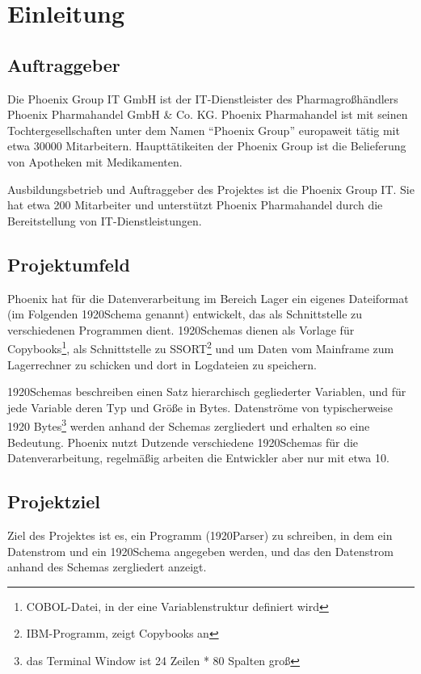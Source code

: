 \section{Einleitung}
\label{sec:Einleitung}


\subsection{Auftraggeber}
\label{sec:Auftraggeber}
Die Phoenix Group IT GmbH ist der IT-Dienstleister des Pharmagroßhändlers Phoenix Pharmahandel
GmbH \& Co. KG. Phoenix Pharmahandel ist mit seinen Tochtergesellschaften unter dem Namen ``Phoenix Group'' europaweit tätig mit etwa 30000 Mitarbeitern. Haupttätikeiten der Phoenix Group ist die Belieferung von Apotheken mit Medikamenten.

Ausbildungsbetrieb und Auftraggeber des Projektes ist die Phoenix Group IT. Sie hat etwa 200 Mitarbeiter und unterstützt Phoenix Pharmahandel durch die Bereitstellung von IT-Dienstleistungen.

\subsection{Projektumfeld} 
\label{sec:Projektumfeld}
Phoenix hat für die Datenverarbeitung im Bereich Lager ein eigenes Dateiformat (im Folgenden 1920Schema genannt) entwickelt, das als Schnittstelle zu verschiedenen Programmen dient. 1920Schemas dienen als Vorlage für Copybooks\footnote{COBOL-Datei, in der eine Variablenstruktur definiert wird}, als Schnittstelle zu SSORT\footnote{IBM-Programm, zeigt Copybooks an} und um Daten vom Mainframe zum Lagerrechner zu schicken und dort in Logdateien zu speichern.

1920Schemas beschreiben einen Satz hierarchisch gegliederter Variablen, und für jede Variable deren Typ und Größe in Bytes. Datenströme von typischerweise 1920 Bytes\footnote{das Terminal Window ist 24 Zeilen * 80 Spalten groß} werden anhand der Schemas zergliedert und erhalten so eine Bedeutung. Phoenix nutzt Dutzende verschiedene 1920Schemas für die Datenverarbeitung, regelmäßig arbeiten die Entwickler aber nur mit etwa 10.

\subsection{Projektziel} 
\label{sec:Projektziel}
Ziel des Projektes ist es, ein Programm (1920Parser) zu schreiben, in dem ein Datenstrom und ein 1920Schema angegeben werden, und das den Datenstrom anhand des Schemas zergliedert anzeigt.



